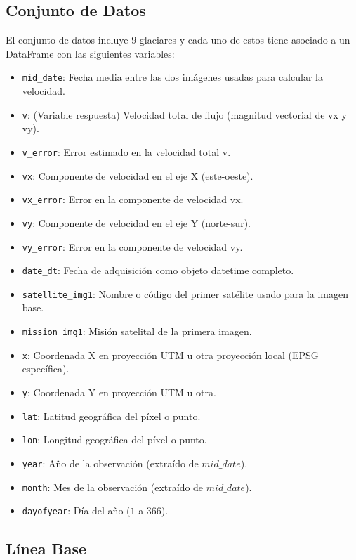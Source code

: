 \documentclass[sigconf,language=spanish]{acmart}
\begin{document}
\subsection{Conjunto de Datos}

El conjunto de datos incluye $9$ glaciares y cada uno de estos tiene asociado a un DataFrame con las siguientes variables:

\begin{itemize}
    \item \verb|mid_date|: Fecha media entre las dos imágenes usadas para calcular la velocidad.
    \item \verb|v|: (Variable respuesta) Velocidad total de flujo (magnitud vectorial de vx y vy).
    \item \verb|v_error|:	Error estimado en la velocidad total v.
    \item \verb|vx|:	Componente de velocidad en el eje X (este-oeste).
    \item \verb|vx_error|:	Error en la componente de velocidad vx.
    \item \verb|vy|:	Componente de velocidad en el eje Y (norte-sur).
    \item \verb|vy_error|:	Error en la componente de velocidad vy.
    \item \verb|date_dt|:	Fecha de adquisición como objeto datetime completo.
    \item \verb|satellite_img1|:	Nombre o código del primer satélite usado para la imagen base.
    \item \verb|mission_img1|:	Misión satelital de la primera imagen.
    \item \verb|x|:	Coordenada X en proyección UTM u otra proyección local (EPSG específica).
    \item \verb|y|:	Coordenada Y en proyección UTM u otra.
    \item \verb|lat|:	Latitud geográfica del píxel o punto.
    \item \verb|lon|:	Longitud geográfica del píxel o punto.
    \item \verb|year|:	Año de la observación (extraído de $mid\_date$).
    \item \verb|month|:	Mes de la observación (extraído de $mid\_date$).
    \item \verb|dayofyear|:	Día del año ($1$ a $366$).

\end{itemize}

\subsection{Línea Base}
\end{document}
